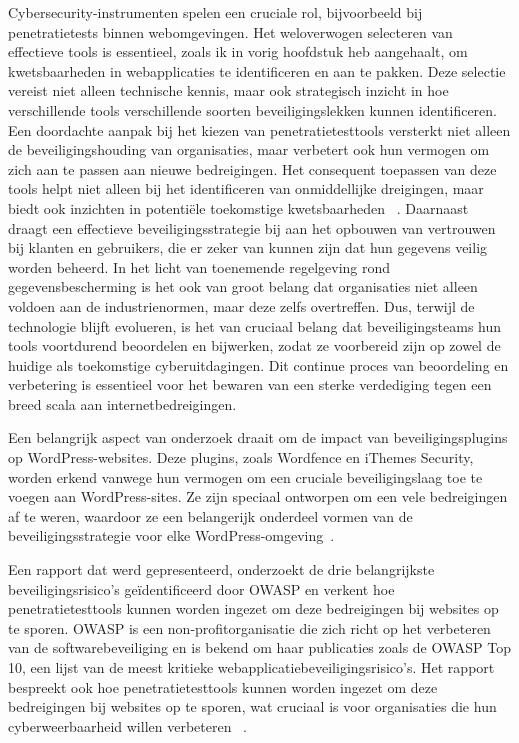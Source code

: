Cybersecurity-instrumenten spelen een cruciale rol, bijvoorbeeld bij penetratietests binnen webomgevingen. Het weloverwogen 
selecteren van effectieve tools is essentieel, zoals ik in vorig hoofdstuk heb aangehaalt, om kwetsbaarheden in webapplicaties te identificeren en aan te pakken. 
Deze selectie vereist niet alleen technische kennis, maar ook strategisch inzicht in hoe verschillende tools verschillende 
soorten beveiligingslekken kunnen identificeren.
Een doordachte aanpak bij het kiezen van penetratietesttools versterkt niet alleen de beveiligingshouding 
van organisaties, maar verbetert ook hun vermogen om zich aan te passen aan nieuwe bedreigingen. Het consequent toepassen 
van deze tools helpt niet alleen bij het identificeren van onmiddellijke dreigingen, maar biedt ook inzichten in potentiële 
toekomstige kwetsbaarheden ~\autocite{Albahar2022}.
Daarnaast draagt een effectieve beveiligingsstrategie bij aan het opbouwen van vertrouwen bij klanten en gebruikers, die er 
zeker van kunnen zijn dat hun gegevens veilig worden beheerd. In het licht van toenemende regelgeving rond gegevensbescherming 
is het ook van groot belang dat organisaties niet alleen voldoen aan de industrienormen, maar deze zelfs overtreffen.
Dus, terwijl de technologie blijft evolueren, is het van cruciaal belang dat beveiligingsteams hun tools voortdurend 
beoordelen en bijwerken, zodat ze voorbereid zijn op zowel de huidige als toekomstige cyberuitdagingen. Dit continue 
proces van beoordeling en verbetering is essentieel voor het bewaren van een sterke verdediging tegen een breed scala 
aan internetbedreigingen.

Een belangrijk aspect van onderzoek draait om de impact van beveiligingsplugins op WordPress-websites. Deze plugins, zoals Wordfence en iThemes Security, worden 
erkend vanwege hun vermogen om een cruciale beveiligingslaag toe te voegen aan WordPress-sites. Ze zijn speciaal ontworpen om een vele bedreigingen af 
te weren, waardoor ze een belangerijk onderdeel vormen van de beveiligingsstrategie voor elke WordPress-omgeving~\autocite{Casola2020}.

Een rapport dat werd gepresenteerd, onderzoekt de drie belangrijkste beveiligingsrisico's geïdentificeerd door OWASP en verkent hoe penetratietesttools kunnen 
worden ingezet om deze bedreigingen bij websites op te sporen. OWASP is een non-profitorganisatie die zich richt op het verbeteren van de softwarebeveiliging 
en is bekend om haar publicaties zoals de OWASP Top 10, een lijst van de meest kritieke webapplicatiebeveiligingsrisico's. Het rapport bespreekt ook hoe 
penetratietesttools kunnen worden ingezet om deze bedreigingen bij websites op te sporen, wat cruciaal is voor organisaties die hun cyberweerbaarheid willen verbeteren
~\autocite{Sharma2023}.

